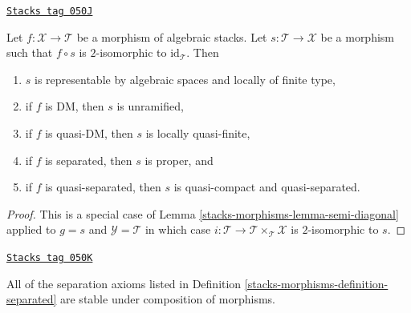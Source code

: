 \begin{lemma}
\label{stacks-morphisms-lemma-section-immersion}
\href{https://stacks.math.columbia.edu/tag/050J}{\texttt{Stacks tag 050J}}

Let $f : \mathcal{X} \to \mathcal{T}$ be a morphism of algebraic stacks.
Let $s : \mathcal{T} \to \mathcal{X}$ be a morphism such that
$f \circ s$ is $2$-isomorphic to $\text{id}_\mathcal{T}$. Then
\begin{enumerate}
\item $s$ is representable by algebraic spaces and locally of finite type,
\item if $f$ is DM, then $s$ is unramified,
\item if $f$ is quasi-DM, then $s$ is locally quasi-finite,
\item if $f$ is separated, then $s$ is proper, and
\item if $f$ is quasi-separated, then $s$ is quasi-compact and quasi-separated.
\end{enumerate}
\end{lemma}

\begin{proof}
This is a special case of Lemma \ref{stacks-morphisms-lemma-semi-diagonal} applied to
$g = s$ and $\mathcal{Y} = \mathcal{T}$ in which case
$i : \mathcal{T} \to \mathcal{T} \times_\mathcal{T} \mathcal{X}$
is $2$-isomorphic to $s$.
\end{proof}

\begin{lemma}
\label{stacks-morphisms-lemma-composition-separated}
\href{https://stacks.math.columbia.edu/tag/050K}{\texttt{Stacks tag 050K}}

All of the separation axioms listed in
Definition \ref{stacks-morphisms-definition-separated}
are stable under composition of morphisms.
\end{lemma}

